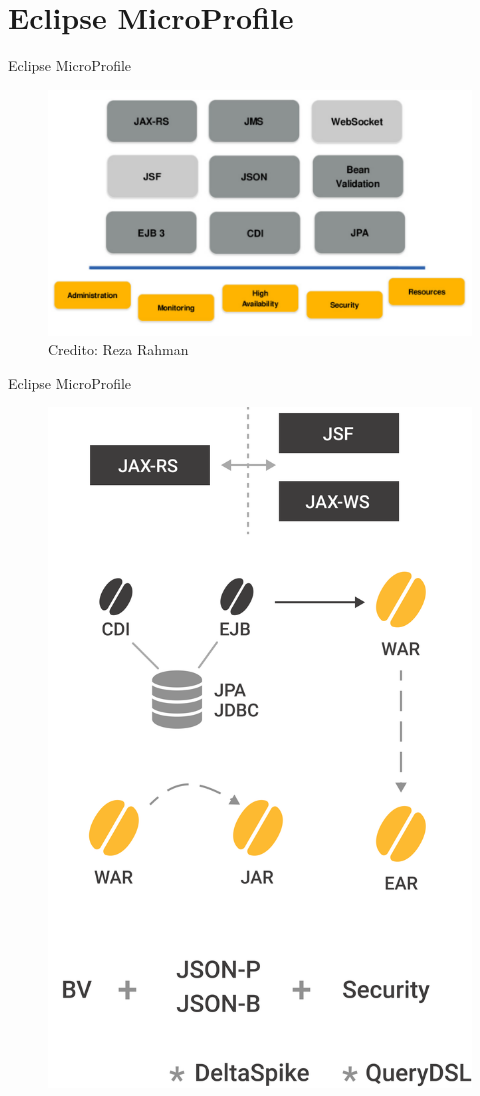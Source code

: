 \documentclass{beamer}
\begin{document}
\section{Eclipse MicroProfile}

\begin{frame}{Eclipse MicroProfile}
\begin{figure}
	\centering
	\includegraphics[width=\linewidth]{Images/javaeemicropancake}
	\caption{Credito: Reza Rahman}
\end{figure}
\end{frame}

\begin{frame}{Eclipse MicroProfile}
	\begin{figure}
		\centering
		\includegraphics[width=0.5\linewidth]{Images/oldsetup}
	\end{figure}
\end{frame}
\end{document}
